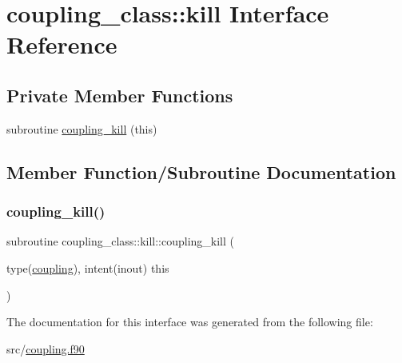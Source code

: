\hypertarget{interfacecoupling__class_1_1kill}{}\section{coupling\+\_\+class\+:\+:kill Interface Reference}
\label{interfacecoupling__class_1_1kill}
\subsection*{Private Member Functions}
\begin{DoxyCompactItemize}
\item 
subroutine \hyperlink{interfacecoupling__class_1_1kill_ae2fe896d7ad1876cf1b7a2a31afcbcdd}{coupling\+\_\+kill} (this)
\end{DoxyCompactItemize}


\subsection{Member Function/\+Subroutine Documentation}
\mbox{\label{interfacecoupling__class_1_1kill_ae2fe896d7ad1876cf1b7a2a31afcbcdd}} 
\subsubsection{\texorpdfstring{coupling\+\_\+kill()}{coupling\_kill()}}
{\footnotesize\ttfamily subroutine coupling\+\_\+class\+::kill\+::coupling\+\_\+kill (\begin{DoxyParamCaption}\item[{type(\hyperlink{structcoupling__class_1_1coupling}{coupling}), intent(inout)}]{this }\end{DoxyParamCaption})\hspace{0.3cm}{\ttfamily [private]}}



The documentation for this interface was generated from the following file\+:\begin{DoxyCompactItemize}
\item 
src/\hyperlink{coupling_8f90}{coupling.\+f90}\end{DoxyCompactItemize}
